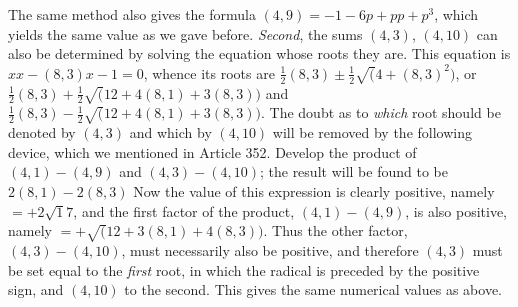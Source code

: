 The same method also gives the formula \((4,9)=-1-6p+pp+p^3\), which yields the same value as we gave before. \textit{Second}, the sums \((4,3)\), \((4,10)\) can also be determined by solving the equation whose roots they are. This equation is \(xx-(8,3)x-1=0\), whence its roots are \(\frac12(8,3)\pm\frac12\surd(4+(8,3)^2)\), or \(\frac12(8,3)+\frac12\surd(12+4(8,1)+3(8,3))\) and \(\frac12(8,3)-\frac12\surd(12+4(8,1)+3(8,3))\). The doubt as to \textit{which} root should be denoted by \((4,3)\) and which by \((4,10)\) will be removed by the following device, which we mentioned in Article 352. Develop the product of \((4,1)-(4,9)\) and \((4,3)-(4,10)\); the result will be found to be \(2(8,1)-2(8,3)\) Now the value of this expression is clearly positive, namely \(=+2\surd 17\), and the first factor of the product, \((4,1)-(4,9)\), is also positive, namely \(=+\surd(12+3(8,1)+4(8,3))\). Thus the other factor, \((4,3)-(4,10)\), must necessarily also be positive, and therefore \((4,3)\) must be set equal to the \textit{first} root, in which the radical is preceded by the positive sign, and \((4,10)\) to the second. This gives the same numerical values as above.

